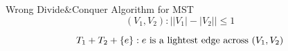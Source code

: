 % 

% 
% 

\begin{frame}{}
  \begin{exampleblock}{Wrong Divide\&Conquer Algorithm for MST}
    \[
      (V_{1}, V_{2}): \Big\rvert |V_{1}| - |V_{2}| \Big\rvert \le 1
    \]
    
    \[
      T_{1} + T_{2} + \left\{e\right\}: e \text{ is a lightest edge across } (V_{1}, V_{2})
    \]
  \end{exampleblock}

  \pause
  \vspace{0.30cm}
\end{frame}
